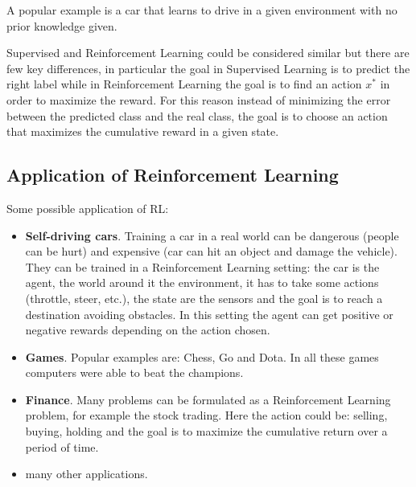 \documentclass[14pt]{extarticle}
\begin{document}
\begin{flushleft}
\begin{itemize}
A popular example is a car that learns to drive in a given environment with no prior knowledge given.
\end{itemize}
Supervised and Reinforcement Learning could be considered similar but there are few key differences, in particular the goal in Supervised Learning is to predict the right label while in Reinforcement Learning the goal is to find an action $x^*$ in order to maximize the reward. For this reason instead of minimizing the error between the predicted class and the real class, the goal is to choose an action that maximizes the cumulative reward in a given state.

\subsection{Application of Reinforcement Learning}
Some possible application of RL:
\begin{itemize}
\item \textbf{Self-driving cars}. Training a car in a real world can be dangerous (people can be hurt) and expensive (car can hit an object and damage the vehicle). They can be trained in a Reinforcement Learning setting: the car is the agent, the world around it the environment, it has to take some actions (throttle, steer, etc.), the state are the sensors and the goal is to reach a destination avoiding obstacles. In this setting the agent can get positive or negative rewards depending on the action chosen.
\item \textbf{Games}. Popular examples are: Chess, Go and Dota. In all these games computers were able to beat the champions.
\item \textbf{Finance}. Many problems can be formulated as a Reinforcement Learning  problem, for example the stock trading. Here the action could be: selling, buying, holding and the goal is to maximize the  cumulative return over a period of time.
\item many other applications\cite{RLapplications}.
\end{itemize}


\end{flushleft}
\end{document}
